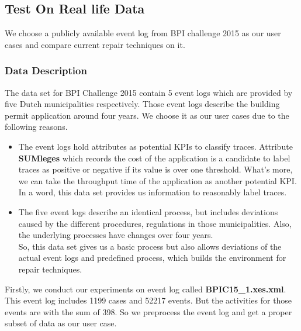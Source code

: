 \subsection{Test On Real life Data}
We choose a publicly available event log from BPI challenge 2015 as our user cases and compare current repair techniques on it. 
\subsubsection{Data Description}
The data set for BPI Challenge 2015 contain 5 event logs which are provided by five Dutch municipalities respectively. Those event logs describe the building permit application around four years. We choose it as our user cases due to the following reasons.
\begin{itemize}
	\item The event logs hold attributes as potential KPIs to classify traces. Attribute \textbf{SUMleges} which records the cost of the application is a candidate to label traces as positive or negative if its value  is over one threshold. What's more, we can take the throughput time of the application as another potential KPI. \\
	In a word, this data set provides us information to reasonably label traces.
	\item The five event logs describe an identical process, but includes deviations caused by the different procedures, regulations in those municipalities. Also, the underlying processes have changes over four years.\\
	So, this data set gives us a basic process but also allows deviations of the actual event logs and predefined process, which builds the environment for repair techniques.
\end{itemize}
Firstly, we conduct our experiments on event log called \textbf{BPIC15\_1.xes.xml}. This event log includes 1199 cases and 52217 events. But the activities for those events are  with the sum of 398. So we preprocess the event log and get a proper subset of data as our user case. 
